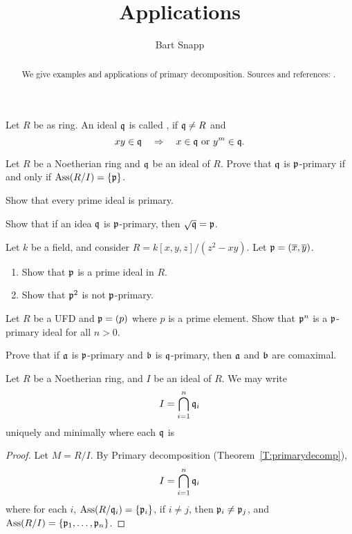\documentclass{ximera}
\author{Bart Snapp}
\title{Applications}
\begin{document}
\begin{abstract}
  We give examples and applications of primary decomposition. Sources
  and references: \cite{AM1969, sD2008, dE1995}.
\end{abstract}
\maketitle



\begin{definition}
  Let $R$ be as ring. An ideal $\mathfrak{q}$ is called , if $\mathfrak{q}\ne
  R$ and
  \[
  xy\in\mathfrak{q} \quad \Rightarrow \quad x\in\mathfrak{q}\text{ or }y^m\in\mathfrak{q}.
  \]
\end{definition}

\begin{exercise}
  Let $R$ be a Noetherian ring and $\mathfrak{q}$ be an ideal of $R$. Prove that
  $\mathfrak{q}$ is $\mathfrak{p}$-primary if and only if $\operatorname{Ass}(R/I) = \{\mathfrak{p}\}$.
\end{exercise}

\begin{exercise}
  Show that every prime ideal is primary.
\end{exercise}

\begin{exercise}
  Show that if an idea $\mathfrak{q}$ is $\mathfrak{p}$-primary, then $\sqrt{\mathfrak{q}} = \mathfrak{p}$.
\end{exercise}

\begin{exercise}
  Let $k$ be a field, and consider $R=k[x,y,z]/(z^2-xy)$. Let $\mathfrak{p} = (\overline{x},\overline{y})$.
  \begin{enumerate}
  \item Show that $\mathfrak{p}$ is a prime ideal in $R$.
  \item Show that $\mathfrak{p}^2$ is not $\mathfrak{p}$-primary.
  \end{enumerate}
\end{exercise}

\begin{exercise}
  Let $R$ be a UFD and $\mathfrak{p} = (p)$ where $p$ is a prime element. Show
  that $\mathfrak{p}^n$ is a $\mathfrak{p}$-primary ideal for all $n>0$.
\end{exercise}

\begin{exercise}
  Prove that if $\mathfrak{a}$ is $\mathfrak{p}$-primary and $\mathfrak{b}$ is $\mathfrak{q}$-primary, then
  $\mathfrak{a}$ and $\mathfrak{b}$ are comaximal.
\end{exercise}



\begin{theorem}
  Let $R$ be a Noetherian ring, and $I$ be an ideal of $R$. We may write
  \[
  I = \bigcap_{i=1}^n \mathfrak{q}_i
  \]
  uniquely and minimally where each $\mathfrak{q}$ is 
  \begin{proof}
    Let $M = R/I$. By Primary decomposition (Theorem~\ref{T:primarydecomp}),
    \[
    I = \bigcap_{i=1}^n \mathfrak{q}_i
    \]
    where for each $i$, $\operatorname{Ass}(R/\mathfrak{q}_i) = \{\mathfrak{p}_i\}$, if $i\ne j$, then
    $\mathfrak{p}_i\ne\mathfrak{p}_j$, and $\operatorname{Ass}(R/I) = \{\mathfrak{p}_1,\dots,\mathfrak{p}_n\}$.
  \end{proof}
\end{theorem}
\end{document}
